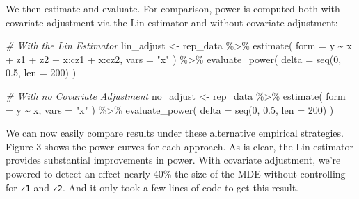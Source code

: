 \documentclass[
  12pt,
]{book}
\newenvironment{Shaded}{\begin{snugshade}}{\end{snugshade}}
\newcommand{\AttributeTok}[1]{\textcolor[rgb]{0.77,0.63,0.00}{#1}}
\newcommand{\CommentTok}[1]{\textcolor[rgb]{0.56,0.35,0.01}{\textit{#1}}}
\newcommand{\DecValTok}[1]{\textcolor[rgb]{0.00,0.00,0.81}{#1}}
\newcommand{\FloatTok}[1]{\textcolor[rgb]{0.00,0.00,0.81}{#1}}
\newcommand{\FunctionTok}[1]{\textcolor[rgb]{0.00,0.00,0.00}{#1}}
\newcommand{\NormalTok}[1]{#1}
\newcommand{\OtherTok}[1]{\textcolor[rgb]{0.56,0.35,0.01}{#1}}
\newcommand{\SpecialCharTok}[1]{\textcolor[rgb]{0.00,0.00,0.00}{#1}}
\newcommand{\StringTok}[1]{\textcolor[rgb]{0.31,0.60,0.02}{#1}}
\theoremstyle{definition}
\theoremstyle{definition}
\theoremstyle{definition}
\theoremstyle{remark}
\begin{document}
We then estimate and evaluate. For comparison, power is computed both
with covariate adjustment via the Lin estimator and without covariate
adjustment:

\begin{Shaded}
\begin{Highlighting}[]
\CommentTok{\# With the Lin Estimator}
\NormalTok{lin\_adjust }\OtherTok{\textless{}{-}}
\NormalTok{  rep\_data }\SpecialCharTok{\%\textgreater{}\%}
  \FunctionTok{estimate}\NormalTok{(}
    \AttributeTok{form =}\NormalTok{ y }\SpecialCharTok{\textasciitilde{}}\NormalTok{ x }\SpecialCharTok{+}\NormalTok{ z1 }\SpecialCharTok{+}\NormalTok{ z2 }\SpecialCharTok{+}\NormalTok{ x}\SpecialCharTok{:}\NormalTok{cz1 }\SpecialCharTok{+}\NormalTok{ x}\SpecialCharTok{:}\NormalTok{cz2,}
    \AttributeTok{vars =} \StringTok{"x"}
\NormalTok{  ) }\SpecialCharTok{\%\textgreater{}\%}
  \FunctionTok{evaluate\_power}\NormalTok{(}
    \AttributeTok{delta =} \FunctionTok{seq}\NormalTok{(}\DecValTok{0}\NormalTok{, }\FloatTok{0.5}\NormalTok{, }\AttributeTok{len =} \DecValTok{200}\NormalTok{)}
\NormalTok{  )}

\CommentTok{\# With no Covariate Adjustment}
\NormalTok{no\_adjust }\OtherTok{\textless{}{-}}
\NormalTok{  rep\_data }\SpecialCharTok{\%\textgreater{}\%}
  \FunctionTok{estimate}\NormalTok{(}
    \AttributeTok{form =}\NormalTok{ y }\SpecialCharTok{\textasciitilde{}}\NormalTok{ x,}
    \AttributeTok{vars =} \StringTok{"x"}
\NormalTok{  ) }\SpecialCharTok{\%\textgreater{}\%}
  \FunctionTok{evaluate\_power}\NormalTok{(}
    \AttributeTok{delta =} \FunctionTok{seq}\NormalTok{(}\DecValTok{0}\NormalTok{, }\FloatTok{0.5}\NormalTok{, }\AttributeTok{len =} \DecValTok{200}\NormalTok{)}
\NormalTok{  )}
\end{Highlighting}
\end{Shaded}

We can now easily compare results under these alternative empirical
strategies. Figure 3 shows the power curves for each approach. As is
clear, the Lin estimator provides substantial improvements in power.
With covariate adjustment, we're powered to detect an effect nearly 40\%
the size of the MDE without controlling for \texttt{z1} and \texttt{z2}.
And it only took a few lines of code to get this result.
\end{document}
